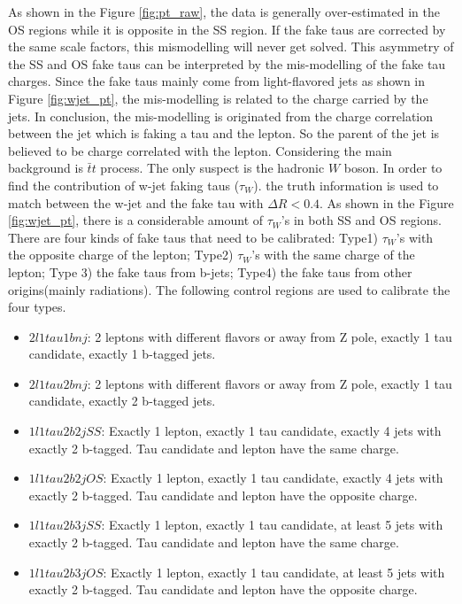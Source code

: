 As shown in the Figure \ref{fig:pt_raw}, the data is generally over-estimated in the OS regions while it is opposite in the SS region. If the fake taus are corrected by the same scale factors, this mismodelling will never get solved. This asymmetry of the SS and OS fake taus can be interpreted by the mis-modelling of the fake tau charges. Since the fake taus mainly come from light-flavored jets as shown in Figure \ref{fig:wjet_pt}, the mis-modelling is related to the charge carried by the jets. In conclusion, the mis-modelling is originated from the charge correlation between the jet which is faking a tau and the lepton. So the parent of the jet is believed to be charge correlated with the lepton. Considering the main background is $\bar{t}t$ process. The only suspect is the hadronic $W$ boson. In order to find the contribution of w-jet faking taus ($\tau_{W}$).  the truth information is used to match between the w-jet and the fake tau with $\Delta R < 0.4$. As shown in the Figure \ref{fig:wjet_pt}, there is a considerable amount of $\tau_{W}$'s in both SS and OS regions. There are four kinds of fake taus that need to be calibrated: Type1) $\tau_{W}$'s with the opposite charge of the lepton; Type2) $\tau_{W}$'s with the same charge of the lepton; Type 3) the fake taus from b-jets; Type4) the fake taus from other origins(mainly radiations). The following control regions are used to calibrate the four types.


\begin{itemize}
\item{$2l1tau1bnj$: 2 leptons with different flavors or away from Z pole, exactly 1 tau candidate,  exactly 1 b-tagged jets.}
\item{$2l1tau2bnj$: 2 leptons with different flavors or away from Z pole, exactly 1 tau candidate,  exactly 2 b-tagged jets.}
\item{$1l1tau2b2j SS$: Exactly 1 lepton, exactly 1 tau candidate, exactly 4 jets with exactly 2 b-tagged. Tau candidate and lepton have the same charge.}
\item{$1l1tau2b2j OS$: Exactly 1 lepton, exactly 1 tau candidate, exactly 4 jets with exactly 2 b-tagged. Tau candidate and lepton have the opposite charge.}
\item{$1l1tau2b3j SS$: Exactly 1 lepton, exactly 1 tau candidate, at least 5 jets with exactly 2 b-tagged. Tau candidate and lepton have the same charge.}
\item{$1l1tau2b3j OS$: Exactly 1 lepton, exactly 1 tau candidate, at least 5 jets with exactly 2 b-tagged. Tau candidate and lepton have the opposite charge.}
\end{itemize}

